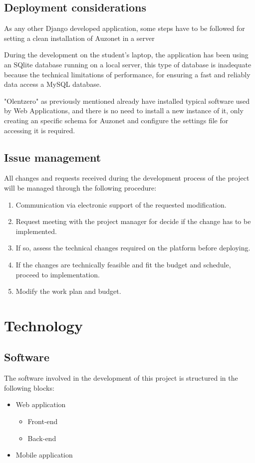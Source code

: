 \documentclass{DeustoFDP}
\begin{document}
\subsection{Deployment considerations}
As any other Django developed application, some steps have to be followed for setting a clean installation of Auzonet in a server

During the development on the student's laptop, the application has been using an SQlite database running on a local server, this type of database is inadequate because the technical limitations of performance, for ensuring a fast and reliably data access a MySQL database. 

"Olentzero" as previously mentioned already have installed typical software used by Web Applications, and there is no need to install a new instance of it, only creating an specific schema for Auzonet and configure the settings file for accessing it is required. 

\subsection{Issue management}
All changes and requests received during the development process of the project will be managed through the following procedure:
\begin{enumerate}
	\item Communication via electronic support of the requested modification.
	\item Request meeting with the project manager for decide if the change has to be implemented.
	\item If so, assess the technical changes required on the platform before deploying.
	\item If the changes are technically feasible and fit the budget and schedule, proceed to implementation.
	\item Modify the work plan and budget.
\end{enumerate}
\section{Technology}
\subsection{Software}
The software involved in the development of this project is structured in the following blocks:
\begin{itemize}
	\item Web application
	\begin{itemize}
		\item Front-end
		\item Back-end
	\end{itemize}
	\item Mobile application
\end{itemize}
\end{document}
